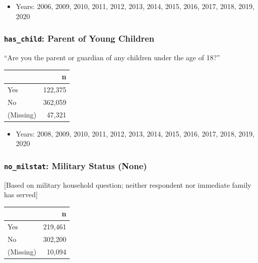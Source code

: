 \documentclass[10pt,article,oneside]{memoir}
\theoremstyle{definition}
\begin{document}
\begin{itemize}
\tightlist
\item
  Years: 2006, 2009, 2010, 2011, 2012, 2013, 2014, 2015, 2016, 2017,
  2018, 2019, 2020
\end{itemize}

\hypertarget{has_child-parent-of-young-children}{%
\subsubsection{\texorpdfstring{\texttt{has\_child}: Parent of Young
Children}{has\_child: Parent of Young Children}}\label{has_child-parent-of-young-children}}

``Are you the parent or guardian of any children under the age of 18?''

\begin{table}[H]
\centering
\begin{tabular}{lr}
\toprule
 & n\\
\midrule
Yes & 122,375\\
No & 362,059\\
(Missing) & 47,321\\
\bottomrule
\end{tabular}
\end{table}

\begin{itemize}
\tightlist
\item
  Years: 2008, 2009, 2010, 2011, 2012, 2013, 2014, 2015, 2016, 2017,
  2018, 2019, 2020
\end{itemize}

\hypertarget{no_milstat-military-status-none}{%
\subsubsection{\texorpdfstring{\texttt{no\_milstat}: Military Status
(None)}{no\_milstat: Military Status (None)}}\label{no_milstat-military-status-none}}

{[}Based on military household question; neither respondent nor
immediate family has served{]}

\begin{table}[H]
\centering
\begin{tabular}{lr}
\toprule
 & n\\
\midrule
Yes & 219,461\\
No & 302,200\\
(Missing) & 10,094\\
\bottomrule
\end{tabular}
\end{table}
\end{document}
